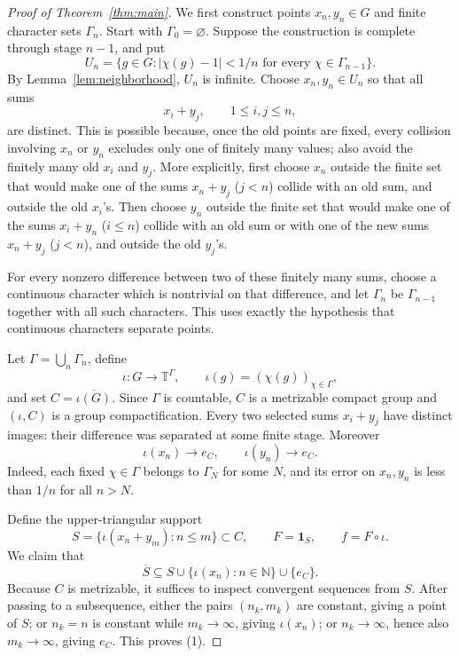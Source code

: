 \documentclass[10pt]{article}
\newcommand{\T}{\mathbb T}
\newcommand{\N}{\mathbb N}
\begin{document}
\begin{proof}[Proof of Theorem~\ref{thm:main}]
We first construct points $x_n,y_n\in G$ and finite character sets $\Gamma_n$. Start with $\Gamma_0=\varnothing$. Suppose the construction is complete through stage $n-1$, and put
\[
 U_n=\{g\in G:|\chi(g)-1|<1/n\text{ for every }\chi\in\Gamma_{n-1}\}.
\]
By Lemma~\ref{lem:neighborhood}, $U_n$ is infinite. Choose $x_n,y_n\in U_n$ so that all sums
\[
 x_i+y_j,\qquad 1\le i,j\le n,
\]
are distinct. This is possible because, once the old points are fixed, every collision involving $x_n$ or $y_n$ excludes only one of finitely many values; also avoid the finitely many old $x_i$ and $y_j$.
More explicitly, first choose $x_n$ outside the finite set that would make one of the sums $x_n+y_j$ ($j<n$) collide with an old sum, and outside the old $x_i$'s. Then choose $y_n$ outside the finite set that would make one of the sums $x_i+y_n$ ($i\le n$) collide with an old sum or with one of the new sums $x_n+y_j$ ($j<n$), and outside the old $y_j$'s.

For every nonzero difference between two of these finitely many sums, choose a continuous character which is nontrivial on that difference, and let $\Gamma_n$ be $\Gamma_{n-1}$ together with all such characters. This uses exactly the hypothesis that continuous characters separate points.

Let $\Gamma=\bigcup_n\Gamma_n$, define
\[
 \iota:G\longrightarrow\T^\Gamma,\qquad
 \iota(g)=(\chi(g))_{\chi\in\Gamma},
\]
and set $C=\overline{\iota(G)}$. Since $\Gamma$ is countable, $C$ is a metrizable compact group and $(\iota,C)$ is a group compactification. Every two selected sums $x_i+y_j$ have distinct images: their difference was separated at some finite stage. Moreover
\[
 \iota(x_n)\longrightarrow e_C,\qquad \iota(y_n)\longrightarrow e_C.
\]
Indeed, each fixed $\chi\in\Gamma$ belongs to $\Gamma_N$ for some $N$, and its error on $x_n,y_n$ is less than $1/n$ for all $n>N$.

Define the upper-triangular support
\[
 S=\{\iota(x_n+y_m):n\le m\}\subset C,
 \qquad F=\mathbf1_S,\qquad f=F\circ\iota.
\]
We claim that
\[
 \overline S\subseteq S\cup\{\iota(x_n):n\in\N\}\cup\{e_C\}.\tag{1}
\]
Because $C$ is metrizable, it suffices to inspect convergent sequences from $S$. After passing to a subsequence, either the pairs $(n_k,m_k)$ are constant, giving a point of $S$; or $n_k=n$ is constant while $m_k\to\infty$, giving $\iota(x_n)$; or $n_k\to\infty$, hence also $m_k\to\infty$, giving $e_C$. This proves (1).


\end{proof}
\end{document}
